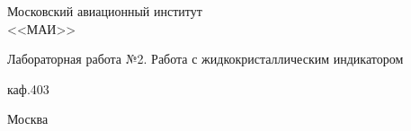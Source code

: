 \newpage
\thispagestyle{empty}

\begin{center}
\begin{Large}
Московский авиационный институт 
\\<<МАИ>>
\end{Large}
\end{center}
\vspace{20em}
\begin{center}
\begin{spacing}{2.0}
{\huge Лабораторная работа №2. Работа с жидкокристаллическим индикатором}
\end{spacing}
\end{center}
\begin{center}
каф.403
\end{center}

\vspace{\fill}

\begin{center}
Москва \the\year
\end{center}